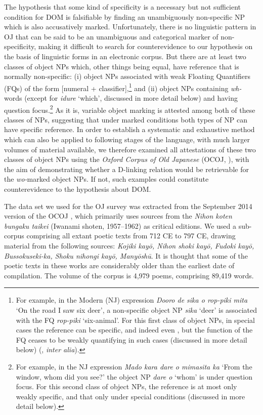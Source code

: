 \documentclass[output=paper]{LSP/langsci}
\begin{document}
The hypothesis that some kind of specificity is a necessary but not
sufficient condition for DOM is falsifiable by finding an
unambiguously non-specific NP which is also accusatively
marked. Unfortunately, there is no linguistic pattern in OJ   that can
be said to be an unambiguous and categorical marker of
non-specificity, making it difficult to search for counterevidence to
our hypothesis on the basis of linguistic forms in an electronic
corpus. But there are at least two classes of object NPs which, other
things being equal, have reference that is normally non-specific: (i)
object NPs associated with weak Floating Quantifiers (FQs) of the form
[numeral + classifier],\footnote{For example, in the Modern 
 (NJ) expression \textit{Dooro de sika o rop-piki mita} ‘On the road
 I saw six deer’, a non-specific object NP \textit{sika} ‘deer’ is
 associated with the FQ \textit{rop-piki} ‘six-animal’. For this
 first class of object NPs, in special cases the reference can be
 specific, and indeed even , but the function of the FQ
 ceases to be weakly quantifying in such cases (discussed in more
 detail below) (\citealt{Kim1995Quantifier}, \textit{inter alia}).}
and (ii) object NPs containing \textit{wh-}words (except for
\textit{idure} ‘which’, discussed in more detail below) and having
question focus.\footnote{For example, in the NJ expression
\textit{Mado kara dare o mimasita ka}  ‘From the window, whom did you
 see?’ the object NP \textit{dare o} ‘whom’ is under question
 focus. For this second class of object NPs, the reference is at most
 only weakly specific, and that only under special conditions
 (discussed in more detail below).} As it is, variable object
marking is attested among both of these classes of NPs, suggesting
that under marked conditions both types of NP can have specific
reference. In order to establish a systematic and exhaustive method
which can also be applied to following stages of the language, with
much larger volumes of material available, we therefore examined all
attestations of these two classes of object NPs using the \textit{Oxford
Corpus of Old Japanese} (OCOJ, \citealt{Frellesvigetal2014Corpus}), with the aim of demonstrating whether a
D-linking relation would be retrievable for the \textit{wo-}marked
object NPs. If not, such examples could constitute counterevidence to
the hypothesis about DOM.


The data set we used for the OJ   survey was extracted from the
September 2014 version of the OCOJ \citep{Frellesvigetal2014Corpus}, 
which primarily uses sources from the \textit{Nihon koten bungaku
 taikei} (Iwanami shoten, 1957–1962) as critical editions. We used
a sub-corpus comprising all extant poetic texts from 712 CE to 797 CE,
drawing material from the following sources: \textit{Kojiki kayō,
 Nihon shoki kayō, Fudoki kayō, Bussokuseki-ka, Shoku nihongi
 kayō, Manyōshū}. It is thought that some of the poetic texts
in these works are considerably older than the earliest date of
compilation. The volume of the corpus is 4,979 poems, comprising
89,419 words.
\end{document}
